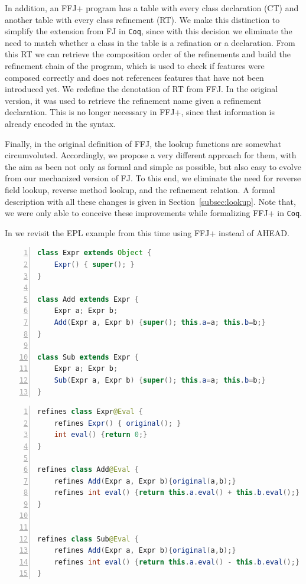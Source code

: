In addition, an \gls{FFJ+} program has a table with every class 
declaration (\textsf{CT}) and another table with every class refinement (\textsf{RT}).
We make this distinction to simplify the extension from \gls{FJ} in \texttt{Coq}, since 
with this decision we eliminate the need to match whether a class in the table 
is a refination or a declaration. From this \textsf{RT} we can retrieve the composition order
of the refinements and build the refinement chain of the program, 
which is used to check if features were composed correctly and
does not references features that have not been introduced yet. 
We redefine the denotation of \textsf{RT} from \gls{FFJ}.
In the original version, it was used to retrieve the refinement name given a 
refinement declaration. This is no longer necessary in \gls{FFJ+}, since
that information is already encoded in the syntax.

Finally, in the original definition of \gls{FFJ}, the lookup functions are 
somewhat circumvoluted. Accordingly, we propose a very different approach
for them, with the aim as been not only as formal and simple as possible, 
but also easy to evolve from our mechanized version of \gls{FJ}. 
To this end, we eliminate the need for reverse field lookup, reverse method lookup, 
and the refinement relation. A formal description with all these changes 
is given in Section~\ref{subsec:lookup}. Note that, we were only 
able to conceive these improvements while formalizing \gls{FFJ+} in 
\texttt{Coq}. 

In  we revisit the EPL example from 
 this time using \gls{FFJ+} instead of AHEAD.

\begin{lstlisting}[language=Java, frame=single, numbers=left, basicstyle=\footnotesize,
    label={lst:expr-ct}, caption={EPL Class Table}, captionpos=b]
class Expr extends Object {
    Expr() { super(); }
}

class Add extends Expr {
    Expr a; Expr b;
    Add(Expr a, Expr b) {super(); this.a=a; this.b=b;}
}

class Sub extends Expr {
    Expr a; Expr b;
    Sub(Expr a, Expr b) {super(); this.a=a; this.b=b;}
}
\end{lstlisting}

\begin{lstlisting}[language=Java, frame=single, numbers=left, basicstyle=\footnotesize,
    label={lst:expr-rt}, caption={EPL Refinement Table}, captionpos=b]
refines class Expr@Eval {
    refines Expr() { original(); }
    int eval() {return 0;}
}

refines class Add@Eval {
    refines Add(Expr a, Expr b){original(a,b);}
    refines int eval() {return this.a.eval() + this.b.eval();}
}


refines class Sub@Eval {
    refines Add(Expr a, Expr b){original(a,b);}
    refines int eval() {return this.a.eval() - this.b.eval();}
}
\end{lstlisting}

